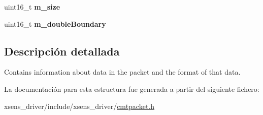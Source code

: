 \begin{DoxyCompactItemize}
\item 
\hypertarget{structxsens_1_1Packet_1_1PacketInfo_a5e2fd07bd044092597caf31edfecd4c3}{uint16\-\_\-t {\bfseries m\-\_\-size}}\label{structxsens_1_1Packet_1_1PacketInfo_a5e2fd07bd044092597caf31edfecd4c3}

\item 
\hypertarget{structxsens_1_1Packet_1_1PacketInfo_a5e6e2840edb3a593960ff9d1ba6f264f}{uint16\-\_\-t {\bfseries m\-\_\-double\-Boundary}}\label{structxsens_1_1Packet_1_1PacketInfo_a5e6e2840edb3a593960ff9d1ba6f264f}

\end{DoxyCompactItemize}


\subsection{\-Descripción detallada}
\-Contains information about data in the packet and the format of that data. 

\-La documentación para esta estructura fue generada a partir del siguiente fichero\-:\begin{DoxyCompactItemize}
\item 
xsens\-\_\-driver/include/xsens\-\_\-driver/\hyperlink{cmtpacket_8h}{cmtpacket.\-h}\end{DoxyCompactItemize}
